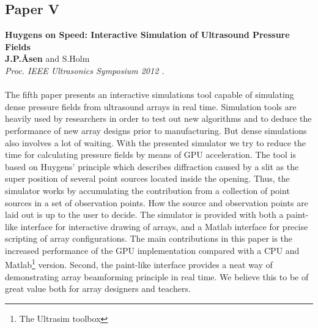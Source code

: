 \subsection{Paper V}
\textbf{Huygens on Speed: Interactive Simulation of Ultrasound Pressure Fields}\\
\textbf{J.\:P.\:\AA{}sen} and S.\:Holm\\
{\it Proc. IEEE Ultrasonics Symposium 2012 .}\\\\
The fifth paper presents an interactive simulations tool capable of simulating dense pressure fields from ultrasound arrays in real time. Simulation tools are heavily used by researchers in order to test out new algorithms and to deduce the performance of new array designs prior to manufacturing. But dense simulations also involves a lot of waiting. With the presented simulator we try to reduce the time for calculating pressure fields by means of GPU acceleration. The tool is based on Huygens' principle which describes diffraction caused by a slit as the super position of several point sources located inside the opening. Thus, the simulator works by accumulating the contribution from a collection of point sources in a set of observation points. How the source and observation points are laid out is up to the user to decide. The simulator is provided with both a paint-like interface for interactive drawing of arrays, and a Matlab interface for precise scripting of array configurations. The main contributions in this paper is the increased performance of the GPU implementation compared with a CPU and Matlab\footnote{The Ultrasim toolbox } version. Second, the paint-like interface provides a neat way of demonstrating array beamforming principle in real time. We believe this to be of great value both for array designers and teachers.

